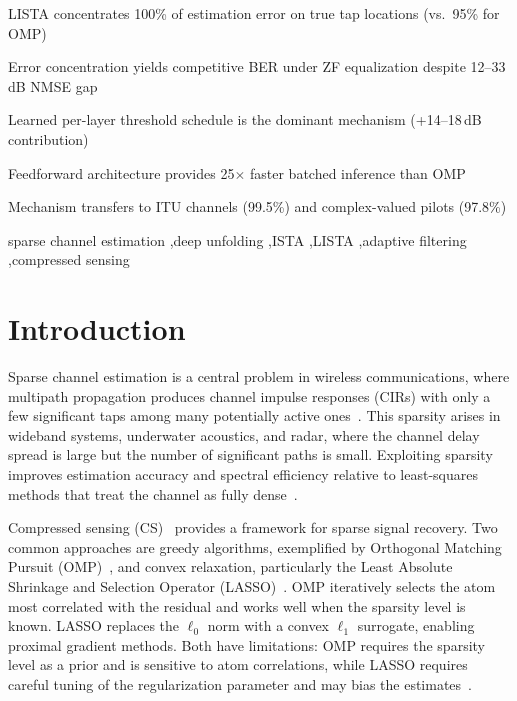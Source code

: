 \documentclass[a4paper,fleqn]{cas-sc}
\begin{document}
\begin{highlights}
\item LISTA concentrates 100\% of estimation error on true tap locations (vs.\ 95\% for OMP)
\item Error concentration yields competitive BER under ZF equalization despite 12--33\,dB NMSE gap
\item Learned per-layer threshold schedule is the dominant mechanism (+14--18\,dB contribution)
\item Feedforward architecture provides 25$\times$ faster batched inference than OMP
\item Mechanism transfers to ITU channels (99.5\%) and complex-valued pilots (97.8\%)
\end{highlights}

\begin{keywords}
sparse channel estimation \sep deep unfolding \sep ISTA \sep LISTA \sep adaptive filtering \sep compressed sensing
\end{keywords}

\maketitle

\section{Introduction}\label{sec:intro}

Sparse channel estimation is a central problem in wireless communications, where multipath propagation produces channel impulse responses (CIRs) with only a few significant taps among many potentially active ones~\citep{bajwa2010compressed, berger2010application}. This sparsity arises in wideband systems, underwater acoustics, and radar, where the channel delay spread is large but the number of significant paths is small. Exploiting sparsity improves estimation accuracy and spectral efficiency relative to least-squares methods that treat the channel as fully dense~\citep{sayed2003fundamentals}.

Compressed sensing (CS)~\citep{candes2006robust, donoho2006compressed} provides a framework for sparse signal recovery. Two common approaches are greedy algorithms, exemplified by Orthogonal Matching Pursuit (OMP)~\citep{tropp2007signal}, and convex relaxation, particularly the Least Absolute Shrinkage and Selection Operator (LASSO)~\citep{tibshirani1996regression}. OMP iteratively selects the atom most correlated with the residual and works well when the sparsity level is known. LASSO replaces the $\ell_0$ norm with a convex $\ell_1$ surrogate, enabling proximal gradient methods. Both have limitations: OMP requires the sparsity level as a prior and is sensitive to atom correlations, while LASSO requires careful tuning of the regularization parameter and may bias the estimates~\citep{daubechies2004iterative}.
\end{document}
